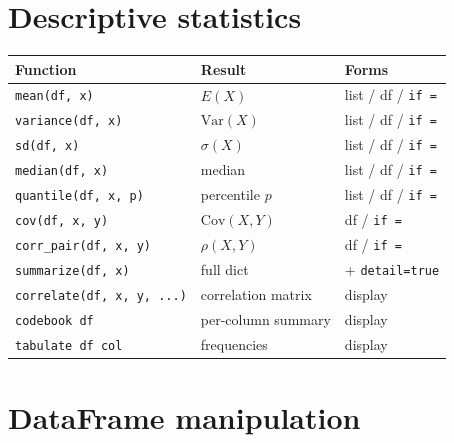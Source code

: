 \section{Descriptive statistics}

\begin{center}
\begin{tabular}{lll}
\toprule
\textbf{Function} & \textbf{Result} & \textbf{Forms} \\
\midrule
\texttt{mean(df, x)}              & $E(X)$             & list / df / \texttt{if =} \\
\texttt{variance(df, x)}          & $\mathrm{Var}(X)$  & list / df / \texttt{if =} \\
\texttt{sd(df, x)}                & $\sigma(X)$        & list / df / \texttt{if =} \\
\texttt{median(df, x)}            & median             & list / df / \texttt{if =} \\
\texttt{quantile(df, x, p)}       & percentile $p$     & list / df / \texttt{if =} \\
\texttt{cov(df, x, y)}            & $\mathrm{Cov}(X,Y)$& df / \texttt{if =} \\
\texttt{corr\_pair(df, x, y)}     & $\rho(X,Y)$        & df / \texttt{if =} \\
\texttt{summarize(df, x)}         & full dict          & + \texttt{detail=true} \\
\texttt{correlate(df, x, y, ...)} & correlation matrix & display \\
\texttt{codebook df}              & per-column summary & display \\
\texttt{tabulate df col}          & frequencies        & display \\
\bottomrule
\end{tabular}
\end{center}

\section{DataFrame manipulation}

